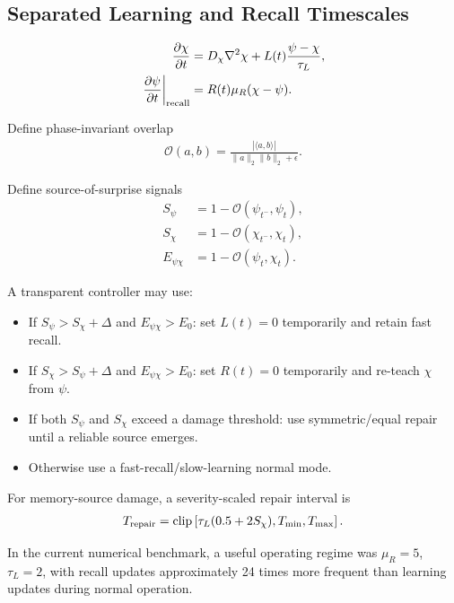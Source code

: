 

\subsection{Separated Learning and Recall Timescales}

\begin{align}
\frac{\partial \chi}{\partial t}
&=
D_\chi\nabla^2\chi
+
L(t)\frac{\psi-\chi}{\tau_L},\\
\left.\frac{\partial\psi}{\partial t}\right|_{\rm recall}
&=
R(t)\mu_R(\chi-\psi).
\end{align}

Define phase-invariant overlap
\begin{align}
\mathcal O(a,b)
=
\frac{|\langle a,b\rangle|}
{\|a\|_2\|b\|_2+\epsilon}.
\end{align}

Define source-of-surprise signals
\begin{align}
S_\psi &= 1-\mathcal O(\psi_{t^-},\psi_t),\\
S_\chi &= 1-\mathcal O(\chi_{t^-},\chi_t),\\
E_{\psi\chi} &= 1-\mathcal O(\psi_t,\chi_t).
\end{align}

A transparent controller may use:

\begin{itemize}
\item If $S_\psi>S_\chi+\Delta$ and $E_{\psi\chi}>E_0$:
      set $L(t)=0$ temporarily and retain fast recall.
\item If $S_\chi>S_\psi+\Delta$ and $E_{\psi\chi}>E_0$:
      set $R(t)=0$ temporarily and re-teach $\chi$ from $\psi$.
\item If both $S_\psi$ and $S_\chi$ exceed a damage threshold:
      use symmetric/equal repair until a reliable source emerges.
\item Otherwise use a fast-recall/slow-learning normal mode.
\end{itemize}

For memory-source damage, a severity-scaled repair interval is
\begin{align}
T_{\rm repair}
=
\operatorname{clip}
\left[
\tau_L(0.5+2S_\chi),T_{\min},T_{\max}
\right].
\end{align}

In the current numerical benchmark, a useful operating regime was
$\mu_R=5$, $\tau_L=2$, with recall updates approximately 24 times more
frequent than learning updates during normal operation.
